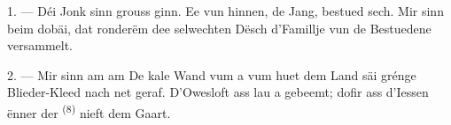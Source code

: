 %
%
%
%
%

\VUsaut{4.0mm}
\VUsaut{1.6mm}
\VUsaut{3.2mm}

\VUsaut{1.6mm}
\VUsaut{2.6mm}

\VUsaut{3.0mm}

1. --- Déi Jonk sinn grouss ginn. Ee vun hinnen, de Jang, bestued sech. Mir sinn
beim  dobäi, dat ronderëm dee selwechten Dësch d'Famillje
vun de Bestuedene versammelt.

2. --- Mir sinn am  am  De kale Wand vum
 a vum  huet dem Land säi grénge Blieder-Kleed nach
net geraf. D'Owesloft ass lau a gebeemt; dofir ass d'Iessen ënner der
 \textsuperscript{(8)} nieft dem Gaart.

